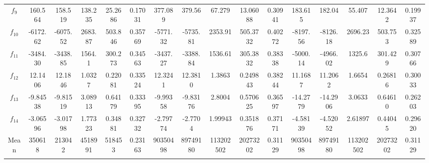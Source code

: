\documentclass[paper=a4, fontsize=11pt]{scrartcl} %
\numberwithin{equation}{section} %
\numberwithin{figure}{section} %
\numberwithin{table}{section} %
\begin{document}
\begin{landscape}
\begin{table}
\begin{tabular}{c|ccccc|ccccc|ccccc}
			$f_{9}$  &  160.564 &  158.519 & 138.235 & 25.2686 & 0.17031 &  377.089 &  379.56  & 67.279  & 13.06088 & 0.30941 &  183.615 &  182.04  & 55.407  & 12.3642 & 0.19937\\
			$f_{10}$ & -6172.62 & -6075.52 & 2683.87 & 503.846 & 0.35769 & -5771.32 & -5735.81 & 2353.91 & 505.3732 & 0.40272 & -8197.56 & -8126.18 & 2696.23 & 503.753 & 0.32589\\
			$f_{11}$ & -3484.30 & -3438.85 & 1564.1  & 300.273 & 0.34563 & -3437.27 & -3388.84 & 1536.61 & 305.3832 & 0.38338 & -5000.14 & -4966.02 & 1325.6  & 301.429 & 0.30766\\
			$f_{12}$ &  12.1406 &  12.1846 & 1.0327  & 0.22081 & 0.33524 &  12.3241 &  12.3810 & 1.3863  & 0.249843 & 0.38244 &  11.1687 &  11.2062 & 1.6654  & 0.26816 & 0.30033\\
			$f_{13}$ & -9.84538 & -9.81519 & 3.08913 & 0.64179 & 0.33395 & -9.99358 & -9.83176 & 2.8004  & 0.570625 & 0.36597 & -14.2779 & -14.2906 & 3.0633  & 0.64610 & 0.26203\\
			$f_{14}$ & -3.06596 & -3.01798 & 1.77323 & 0.34881 & 0.32732 & -2.79774 & -2.7704  & 1.99943 & 0.351876 & 0.37171 & -4.58139 & -4.52052 & 2.61897 & 0.44045 & 0.29620\\		
			
			\noalign{\smallskip}\hline\noalign{\smallskip}
			Mean & 350618 & 213042 & 4518991 & 518453 & 0.23163 & 90350498 & 89749180 & 113202502 & 20273202 & 0.31129 & 90350498 & 89749180 & 113202502 & 20273202 & 0.31129\\
			\noalign{\smallskip}\hline\noalign{\smallskip}
			\multicolumn{16}{l}{\tiny $^1$ 3.2GHz AMD Ryzen 7 1700X, 16 GB RAM}
		\end{tabular}\label{DE_30}
	\end{table}
\end{landscape}

\pagebreak

\end{document}
